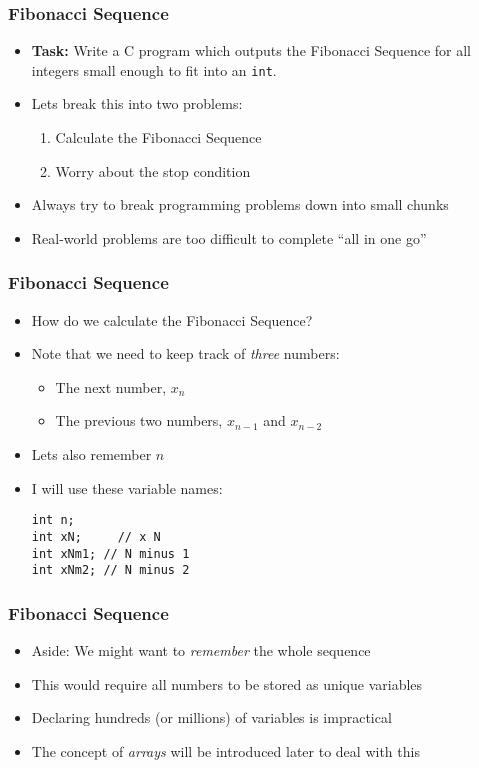 \documentclass[14pt]{beamer}
\begin{document}
\begin{frame}
\frametitle{Fibonacci Sequence}
\begin{itemize}
\item \textbf{Task:} Write a C program which outputs the Fibonacci Sequence for all integers small enough to fit into an \texttt{int}.
\item Lets break this into two problems:
	\begin{enumerate}
		\item Calculate the Fibonacci Sequence
		\item Worry about the stop condition
	\end{enumerate}
\item Always try to break programming problems down into small chunks
\item Real-world problems are too difficult to complete ``all in one go''
\end{itemize}
\end{frame}


\begin{frame}[fragile]
\frametitle{Fibonacci Sequence}
\begin{itemize}
	\item How do we calculate the Fibonacci Sequence?
	\item Note that we need to keep track of \textit{three} numbers:
		\begin{itemize}
			\item The next number, $x_n$
			\item The previous two numbers, $x_{n-1}$ and $x_{n-2}$
		\end{itemize}
	\item Lets also remember $n$
	\item I will use these variable names:
		\begin{lstlisting}[style=CStyle]
int n;
int xN;		// x N
int xNm1; // N minus 1
int xNm2; // N minus 2
\end{lstlisting}
\end{itemize}
\end{frame}

\begin{frame}
\frametitle{Fibonacci Sequence}
\begin{itemize}
\item Aside: We might want to \textit{remember} the whole sequence
\item This would require all numbers to be stored as unique variables
\item Declaring hundreds (or millions) of variables is impractical
\item The concept of \textit{arrays} will be introduced later to deal with this
\end{itemize}
\end{frame}
\end{document}
